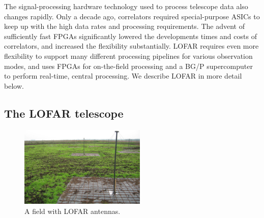 \documentclass{article}
\begin{document}
The signal-processing hardware technology used to process telescope
data also changes rapidly.  Only a decade ago, correlators required
special-purpose ASICs to keep up with the high data rates and
processing requirements.  The advent of sufficiently fast FPGAs
significantly lowered the developments times and costs of
correlators, and increased the flexibility
substantially. LOFAR requires even more flexibility to support many
different processing pipelines for various observation modes, and uses
FPGAs for on-the-field processing and a BG/P
supercomputer to perform real-time, central processing.
We describe LOFAR in more detail below.



\subsection{The LOFAR telescope}

\begin{figure}[t]
\vspace{-0.4cm}
\begin{center}
\includegraphics[width=60mm]{figures/LBA-field.jpg}
\end{center}
\vspace{-0.5cm}
\caption{A field with LOFAR antennas.}
\label{fig:lba-field}
\end{figure}
\end{document}
